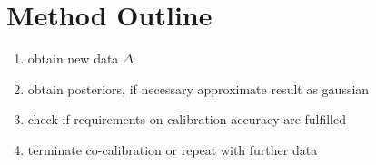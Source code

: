 \documentclass[10pt]{article}
\begin{document}
\section{Method Outline}
\begin{enumerate}
    \item obtain new data $\Delta$
    \item obtain posteriors, if necessary approximate result as gaussian
    \item check if requirements on calibration accuracy are fulfilled
    \item terminate co-calibration or repeat with further data
\end{enumerate}



    
\end{document}
